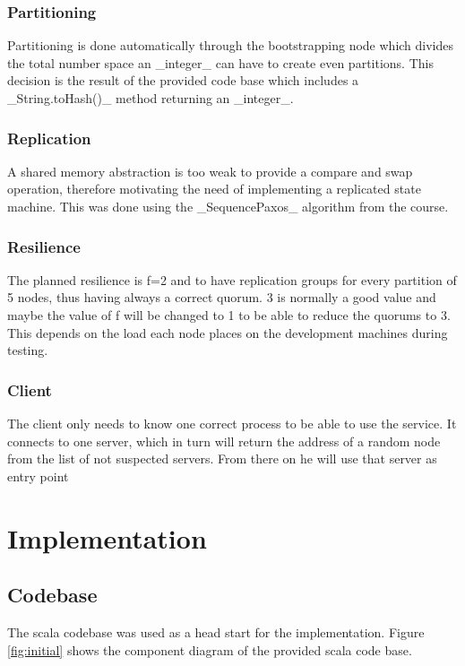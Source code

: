 \documentclass[a4paper]{scrartcl}
\begin{document}
\subsubsection{Partitioning}
Partitioning is done automatically through the bootstrapping node which divides the total number space an _integer_ can have to create even partitions. 
This decision is the result of the provided code base which includes a _String.toHash()_ method returning an _integer_.

\subsubsection{Replication}
A shared memory abstraction is too weak to provide a compare and swap operation, therefore motivating the need of implementing a replicated state machine.
This was done using the _SequencePaxos_ algorithm from the course.

\subsubsection{Resilience}
The planned resilience is f=2 and to have replication groups for every partition of 5 nodes, thus having always a correct quorum. 3 is normally a good value and maybe the value of f will be changed to 1 to be able to reduce the quorums to 3. This depends on the load each node places on the development machines during testing. 

\subsubsection{Client}
The client only needs to know one correct process to be able to use the service.
It connects to one server, which in turn will return the address of a random node from the list of not suspected servers.
From there on he will use that server as entry point  





\section{Implementation}

\subsection{Codebase}
The scala codebase was used as a head start for the implementation.
Figure \ref{fig:initial} shows the component diagram of the provided scala code base. 
\end{document}
